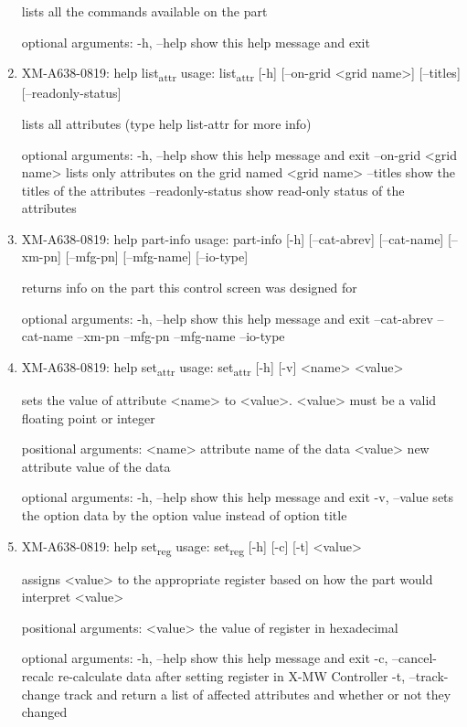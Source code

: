 \documentclass[11pt]{article}
\begin{document}
\begin{enumerate}
lists all the commands available on the part

optional arguments:
  -h, --help  show this help message and exit

\item XM-A638-0819: help list\textsubscript{attr}
\label{sec:org00114f0}
usage: list\textsubscript{attr} [-h] [--on-grid <grid name>] [--titles] [--readonly-status]

lists all attributes (type help list-attr for more info)

optional arguments:
  -h, --help            show this help message and exit
  --on-grid <grid name>
                        lists only attributes on the grid named <grid name>
  --titles              show the titles of the attributes
  --readonly-status     show read-only status of the attributes

\item XM-A638-0819: help part-info
\label{sec:org10031d4}
usage: part-info  [-h] [--cat-abrev] [--cat-name] [--xm-pn] [--mfg-pn] [--mfg-name]
        [--io-type]

returns info on the part this control screen was designed for

optional arguments:
  -h, --help   show this help message and exit
  --cat-abrev
  --cat-name
  --xm-pn
  --mfg-pn
  --mfg-name
  --io-type

\item XM-A638-0819: help set\textsubscript{attr}
\label{sec:org3855c20}
usage: set\textsubscript{attr} [-h] [-v] <name> <value>

sets the value of attribute <name> to <value>. <value> must be a valid
floating point or integer

positional arguments:
  <name>       attribute name of the data
  <value>      new attribute value of the data

optional arguments:
  -h, --help   show this help message and exit
  -v, --value  sets the option data by the option value instead of option
               title

\item XM-A638-0819: help set\textsubscript{reg}
\label{sec:orgfa84b3b}
usage: set\textsubscript{reg} [-h] [-c] [-t] <value>

assigns <value> to the appropriate register based on how the part would
interpret <value>

positional arguments:
  <value>              the value of register in hexadecimal

optional arguments:
  -h, --help           show this help message and exit
  -c, --cancel-recalc  re-calculate data after setting register in X-MW
                       Controller
  -t, --track-change   track and return a list of affected attributes and
                       whether or not they changed


\end{enumerate}
\end{document}
